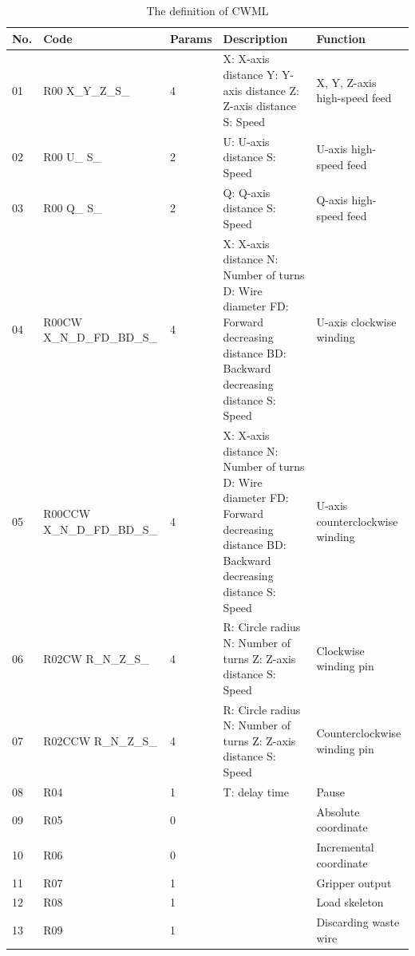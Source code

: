 \documentclass[journal]{IEEEtran}
\begin{document}
\begin{table}
	\scriptsize \caption{The definition of CWML}
	\label{table:result1}
	\begin{center}
		\renewcommand{\arraystretch}{1.4}
		\setlength\tabcolsep{3pt}
		\begin{tabular}{|p{0.3cm}|p{2cm}|p{0.7cm}|p{2cm}|p{2cm}|}
			\hline
			No. & Code & Params & Description & Function\\
			\hline
			01  & R00 X\_Y\_Z\_S\_ & 4 & X: X-axis distance Y: Y-axis distance Z: Z-axis distance S: Speed & X, Y, Z-axis high-speed feed \\
			\hline
			02  & R00 U\_ S\_ & 2 & U: U-axis distance S: Speed & U-axis high-speed feed \\
			\hline
			03  & R00 Q\_ S\_ & 2 & Q: Q-axis distance S: Speed & Q-axis high-speed feed \\
			\hline
			04  & R00CW X\_N\_D\_FD\_BD\_S\_  & 4 & X: X-axis distance N: Number of turns D: Wire diameter FD: Forward decreasing distance BD: Backward decreasing distance S: Speed & U-axis clockwise winding \\
			\hline
			05  & R00CCW X\_N\_D\_FD\_BD\_S\_ & 4 & X: X-axis distance N: Number of turns D: Wire diameter FD: Forward decreasing distance BD: Backward decreasing distance S: Speed & U-axis counterclockwise winding \\
			\hline
			06  & R02CW R\_N\_Z\_S\_ 	 & 4 & R: Circle radius N: Number of turns Z: Z-axis distance S: Speed & Clockwise winding pin \\
			\hline
			07  & R02CCW R\_N\_Z\_S\_ & 4 & R: Circle radius N: Number of turns Z: Z-axis distance S: Speed & Counterclockwise winding pin \\
			\hline
			08  & R04 & 1 & T: delay time & Pause \\
			\hline
			09  & R05	 & 0 &  & Absolute coordinate \\
			\hline
			10  & R06	 & 0 &  & Incremental coordinate \\
			\hline
			11  & R07 & 1 &  & Gripper output \\
			\hline
			12 & R08 & 1 &  & Load skeleton\\
			\hline
			13 & R09 & 1 &  & Discarding waste wire\\
			\hline
		\end{tabular}
	\end{center}
\end{table}
\end{document}
